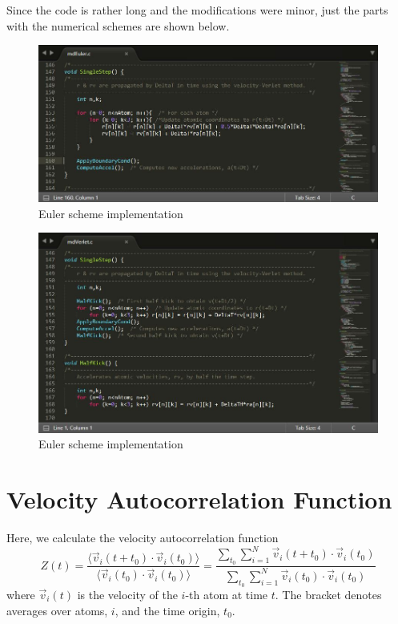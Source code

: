 \documentclass[11pt, oneside]{article}   	%
\begin{document}
Since the code is rather long and the modifications were minor, just the parts with the numerical schemes are shown below.
	\begin{figure}[!htbp]
	\centering
	\includegraphics[scale=0.8]{EulerScheme.jpg}
	\caption{Euler scheme implementation}
	\end{figure}
	
	\begin{figure}[!htbp]
	\centering
	\includegraphics[scale=0.8]{VelVerletScheme.jpg}
	\caption{Euler scheme implementation}
	\end{figure}
	
\section{Velocity Autocorrelation Function}
 Here, we calculate the velocity autocorrelation function
 	\begin{equation}
 	Z(t) = \frac{\langle \vec{v}_i(t+t_0) \cdot \vec{v}_i(t_0) \rangle}{\langle \vec{v}_i(t_0) \cdot \vec{v}_i(t_0) \rangle} = \frac{\sum \limits_{t_0} \sum \limits_{i=1}^N \vec{v}_i(t+t_0) \cdot \vec{v}_i(t_0)}{\sum \limits_{t_0} \sum \limits_{i=1}^N  \vec{v}_i(t_0) \cdot \vec{v}_i(t_0)}
 	\end{equation}
 	where $\vec{v}_i(t)$ is the velocity of the $i$-th atom at time $t$. The bracket denotes averages over
atoms, $i$, and the time origin, $t_0$.
\end{document}
